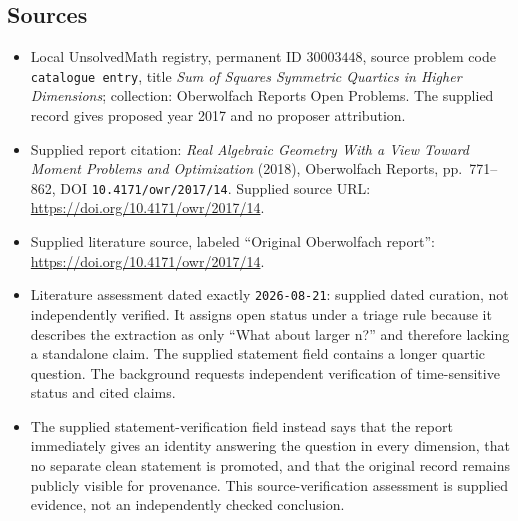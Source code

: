 \documentclass[11pt]{article}
\begin{document}
\subsection{Sources}
\begin{itemize}
\item Local UnsolvedMath registry, permanent ID \(30003448\), source problem code \texttt{catalogue entry}, title \emph{Sum of Squares Symmetric Quartics in Higher Dimensions}; collection: Oberwolfach Reports Open Problems. The supplied record gives proposed year 2017 and no proposer attribution.
\item Supplied report citation: \emph{Real Algebraic Geometry With a View Toward Moment Problems and Optimization} (2018), Oberwolfach Reports, pp.\ 771--862, DOI \texttt{10.4171/owr/2017/14}. Supplied source URL: \url{https://doi.org/10.4171/owr/2017/14}.
\item Supplied literature source, labeled ``Original Oberwolfach report'': \url{https://doi.org/10.4171/owr/2017/14}.
\item Literature assessment dated exactly \texttt{2026-08-21}: supplied dated curation, not independently verified. It assigns open status under a triage rule because it describes the extraction as only ``What about larger n?'' and therefore lacking a standalone claim. The supplied statement field contains a longer quartic question. The background requests independent verification of time-sensitive status and cited claims.
\item The supplied statement-verification field instead says that the report immediately gives an identity answering the question in every dimension, that no separate clean statement is promoted, and that the original record remains publicly visible for provenance. This source-verification assessment is supplied evidence, not an independently checked conclusion.
\end{itemize}
\end{document}
